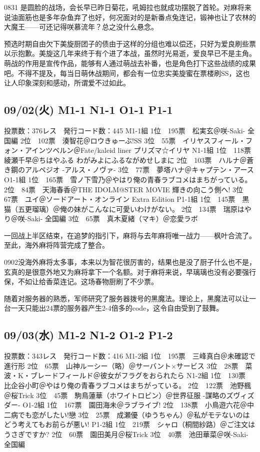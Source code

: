 0831 是圆脸的战场，会长早已昨日菊花，吼姆拉也就成功摆脱了首轮。对麻将来说油面筋也是多年杂鱼弃了也好，何况面对的是新番点兔连记，锻神也让了农林的大魔王——可还记得咲慕流年？总之没什么悬念。

预选时期自由欠下美旋厨团子的债由于这样的分组也难以偿还，只好为爱良刷些票以示抱歉。美旋这几年来终于有个进了本战，虽然时光易逝，爱良早已不是主角。萌战的作用是宣传作品，能够有人通过萌战去补番，也是角色打下这些战绩的成果吧。不得不提及，每当日萌休战期间，都会有一位忠实美旋蜜在票楼刷SS，这也让人印象深刻和感动，所谓爱不过如此。

\subsection{09/02(火) M1-1 N1-1 O1-1 P1-1}

	投票数：376レス　発行コード数：445
	M1-1組
	1位　195票　松実玄＠咲-Saki- 全国編
	2位　102票　湊智花＠ロウきゅーぶ!SS
	3位　55票　イリヤスフィール・フォン・アインツベルン＠Fate/kaleid liner プリズマ☆イリヤ
	N1-1組
	1位　118票　綾瀬千早＠ちはやふる わがみよにふるながめせしまに
	2位　103票　ハルナ＠蒼き鋼のアルペジオ -アルス・ノヴァ-
	3位　77票　夢塔ハナ＠キャプテン・アース
	O1-1組
	1位　165票　雪ノ下雪乃＠やはり俺の青春ラブコメはまちがっている。
	2位　84票　天海春香＠THE IDOLM@STER MOVIE 輝きの向こう側へ!
	3位　67票　ユイ＠ソードアート・オンライン Extra Edition
	P1-1組
	1位　145票　黒猫（五更瑠璃）＠俺の妹がこんなに可愛いわけがない。
	2位　134票　瑞原はやり＠咲-Saki- 全国編
	3位　65票　真木夏緒（マキ）＠恋愛ラボ

一回战上半区结束，在追梦的指引下，麻将与去年麻将唯一战力——枫叶合流了。至此，海外麻将阵营完成了整合。

0902没海外麻将太多事，本来以为智花很厉害的，结果也是没了厨子什么也不是，玄真的是很意外地又为麻将拿下一个名额。对于麻将来说，早璃璃也没有必要强行保，不如让给香菜连记。这场春物厨刷了不少票。

随着对服务器的熟悉，军师研究了服务器拨号的黑魔法。理论上，黑魔法可以让一台一天只能出24票的服务器产生2-4倍多的code，这令自由受到了鼓舞。

\subsection{09/03(水) M1-2 N1-2 O1-2 P1-2}

	投票数：343レス　発行コード数：416
	M1-2組
	1位　195票　三峰真白＠未確認で進行形
	2位　65票　山神ルーシー（略）＠サーバント×サービス
	3位　28票　菜波・K・ブレードフィールド＠彼女がフラグをおられたら
	N1-2組
	1位　130票　比企谷小町＠やはり俺の青春ラブコメはまちがっている。
	2位　122票　池野楓＠桜Trick
	3位　45票　駒鳥蓮華（ホワイトロビン）＠世界征服 -謀略のズヴィズダー-
	O1-2組
	1位　167票　園田海未＠ラブライブ!
	2位　138票　小鳥遊六花＠中二病でも恋がしたい!戀
	3位　25票　成瀬優（ゆうちゃん）＠私がモテないのはどう考えてもお前らが悪い!
	P1-2組
	1位　219票　シャロ（桐間紗路）＠ご注文はうさぎですか?
	2位　60票　園田美月＠桜Trick
	3位　40票　池田華菜＠咲-Saki- 全国編

